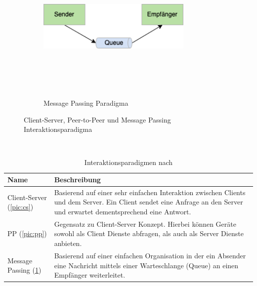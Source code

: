 \begin{figure}[hbt!]
\begin{subfigure}[b]{0.4\textwidth}
            \end{subfigure}
            \begin{subfigure}[b]{0.4\textwidth}
                \centering
                \includegraphics[width=7.5cm,height=7.5cm,keepaspectratio]{images/messagepassing.png}
                \caption{Message Passing Paradigma}
                \label{pic:messagepassing}
            \end{subfigure}
            \caption{Client-Server, Peer-to-Peer und Message Passing Interaktionsparadigma \cite{IEEE2015}}
            \label{pic:interactionparadigm}
        \end{figure}
        \\ 
        \begin{table}[hbt!]
            \begin{center}
                \begin{tabular}{| p{3cm} | p{12.75cm} | }
                    \hline
                        \textbf{Name} & \textbf{Beschreibung} \\
                    \hline
                        Client-Server (\ref{pic:cs}) & Basierend auf einer sehr einfachen Interaktion zwischen Clients und dem Server. Ein Client sendet eine Anfrage an den Server und erwartet dementsprechend eine Antwort. \\ 
                    \hline
                        \ac{PP} (\ref{pic:pp}) & Gegensatz zu Client-Server Konzept. Hierbei können Geräte sowohl als Client Dienste abfragen, als auch als Server Dienste anbieten. \\ 
                    \hline
                        Message Passing (\ref{pic:messagepassing}) & Basierend auf einer einfachen Organisation in der ein Absender eine Nachricht mittels einer Warteschlange (Queue) an einen Empfänger weiterleitet. \\ 
                    \hline
                \end{tabular}
            \end{center}
            \caption{Interaktionsparadigmen nach \cite{IEEE2015}}
            \label{table:kommunikationdmodelle}
        \end{table}
